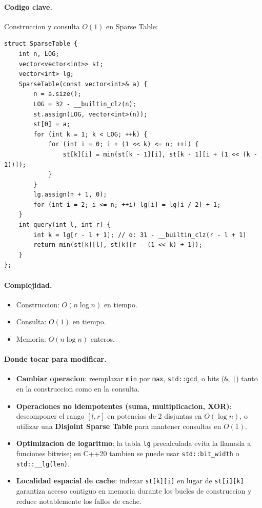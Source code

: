 \paragraph{Codigo clave.}
Construccion y consulta $O(1)$ en Sparse Table:
\begin{verbatim}
struct SparseTable {
    int n, LOG;
    vector<vector<int>> st;
    vector<int> lg;
    SparseTable(const vector<int>& a) {
        n = a.size();
        LOG = 32 - __builtin_clz(n);
        st.assign(LOG, vector<int>(n));
        st[0] = a;
        for (int k = 1; k < LOG; ++k) {
            for (int i = 0; i + (1 << k) <= n; ++i) {
                st[k][i] = min(st[k - 1][i], st[k - 1][i + (1 << (k - 1))]);
            }
        }
        lg.assign(n + 1, 0);
        for (int i = 2; i <= n; ++i) lg[i] = lg[i / 2] + 1;
    }
    int query(int l, int r) {
        int k = lg[r - l + 1]; // o: 31 - __builtin_clz(r - l + 1)
        return min(st[k][l], st[k][r - (1 << k) + 1]);
    }
};
\end{verbatim}

\paragraph{Complejidad.}
\begin{itemize}\setlength\itemsep{0pt}
	\item Construccion: $O(n \log n)$ en tiempo.
	\item Consulta: $O(1)$ en tiempo.
	\item Memoria: $O(n \log n)$ enteros.
\end{itemize}

\paragraph{Donde tocar para modificar.}
\begin{itemize}\setlength\itemsep{0pt}
	\item \textbf{Cambiar operacion}: reemplazar \texttt{min} por \texttt{max}, \texttt{std::gcd}, o bits (\texttt{\&}, \texttt{|}) tanto en la construccion como en la consulta.
	\item \textbf{Operaciones no idempotentes (suma, multiplicacion, XOR)}: descomponer el rango $[l, r]$ en potencias de 2 disjuntas en $O(\log n)$, o utilizar una \textbf{Disjoint Sparse Table} para mantener consultas en $O(1)$.
	\item \textbf{Optimizacion de logaritmo}: la tabla \texttt{lg} precalculada evita la llamada a funciones bitwise; en C++20 tambien se puede usar \texttt{std::bit\_width} o \texttt{std::\_\_lg(len)}.
	\item \textbf{Localidad espacial de cache}: indexar \texttt{st[k][i]} en lugar de \texttt{st[i][k]} garantiza acceso contiguo en memoria durante los bucles de construccion y reduce notablemente los fallos de cache.
\end{itemize}

